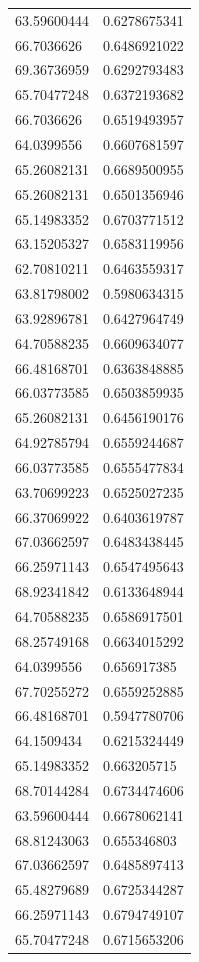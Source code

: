 \begin{longtable}{@{}ll@{}}
63.59600444 & 0.6278675341 \\
66.7036626  & 0.6486921022 \\
69.36736959 & 0.6292793483 \\
65.70477248 & 0.6372193682 \\
66.7036626  & 0.6519493957 \\
64.0399556  & 0.6607681597 \\
65.26082131 & 0.6689500955 \\
65.26082131 & 0.6501356946 \\
65.14983352 & 0.6703771512 \\
63.15205327 & 0.6583119956 \\
62.70810211 & 0.6463559317 \\
63.81798002 & 0.5980634315 \\
63.92896781 & 0.6427964749 \\
64.70588235 & 0.6609634077 \\
66.48168701 & 0.6363848885 \\
66.03773585 & 0.6503859935 \\
65.26082131 & 0.6456190176 \\
64.92785794 & 0.6559244687 \\
66.03773585 & 0.6555477834 \\
63.70699223 & 0.6525027235 \\
66.37069922 & 0.6403619787 \\
67.03662597 & 0.6483438445 \\
66.25971143 & 0.6547495643 \\
68.92341842 & 0.6133648944 \\
64.70588235 & 0.6586917501 \\
68.25749168 & 0.6634015292 \\
64.0399556  & 0.656917385  \\
67.70255272 & 0.6559252885 \\
66.48168701 & 0.5947780706 \\
64.1509434  & 0.6215324449 \\
65.14983352 & 0.663205715  \\
68.70144284 & 0.6734474606 \\
63.59600444 & 0.6678062141 \\
68.81243063 & 0.655346803  \\
67.03662597 & 0.6485897413 \\
65.48279689 & 0.6725344287 \\
66.25971143 & 0.6794749107 \\
65.70477248 & 0.6715653206 \\

\end{longtable}
